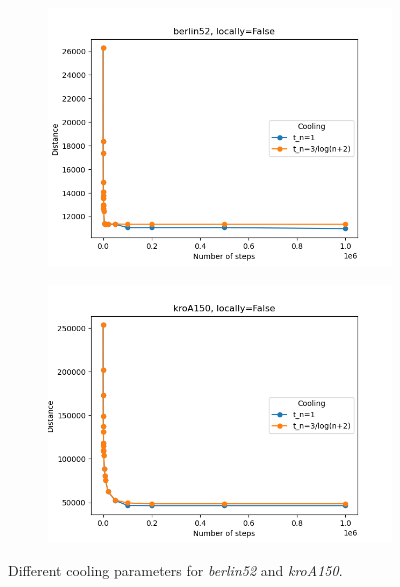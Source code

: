 \begin{figure}[!htb]
	\centering
	\begin{subfigure}{0.45\textwidth}
		\includegraphics[width=\textwidth]{img/berlin52_annealing_locally=False}
	\end{subfigure}
	\begin{subfigure}{0.45\textwidth}
		\includegraphics[width=\textwidth]{img/kroA150_annealing_locally=False}
	\end{subfigure}
	\caption{Different cooling parameters for \textit{berlin52} and \textit{kroA150}.}
	\label{fig:annealing_1}
\end{figure}

